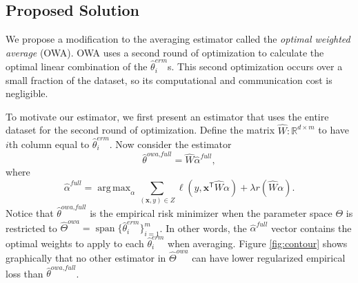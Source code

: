 \documentclass[twoside]{article}
\DeclareMathOperator*{\argmin}{arg\,min}
\DeclareMathOperator*{\argmax}{arg\,max}
\DeclareMathOperator*{\vecspan}{span}
\newcommand{\Q}{\mathcal{Q}}
\newcommand{\matW}{\hat W}
\newcommand{\W}{{\hat \Theta^{\textit{owa}}}}
\newcommand{\x}{\mathbf{x}}
\newcommand{\w}{\theta}
\newcommand{\ahat}{\hat\alpha}
\newcommand{\afull}{\ahat^{\textit{full}}}
\newcommand{\wowafull}{\hat\w^{\textit{owa,full}}}
\newcommand{\wmle}{\hat\w^{erm}}
\newcommand{\wstar}{{\w^{*}}}
\newcommand{\wq}{\hat\w^{q}}
\newcommand{\wqstar}{\hat\w^{q^*}}
\newcommand{\reg}{r}
\newcommand{\loss}{\ell}
\newcommand{\trans}[1]{\ensuremath{{#1}^{\mathsf{T}}}}
\newcommand{\ltwo}[1]{{\lVert {#1} \rVert}}
\begin{document}

\subsection{Proposed Solution}

We propose a modification to the averaging estimator called the \emph{optimal weighted average} (OWA). 
OWA uses a second round of optimization to calculate the optimal linear combination of the $\wmle_i$s.
This second optimization occurs over a small fraction of the dataset,
so its computational and communication cost is negligible.

To motivate our estimator,
we first present an estimator that uses the entire dataset for the second round of optimization.
Define the matrix $\matW : \mathbb{R}^{d\times m}$ to have $i$th column equal to $\wmle_i$.
Now consider the estimator
\begin{equation}
\wowafull = \matW \afull
,
\end{equation}
where
\begin{equation}
\label{eq:afull}
\afull = \argmax_\alpha \sum _{(\x,y)\in Z} \loss\left(y,\trans\x \matW \alpha \right)
+
\lambda \reg(\matW\alpha)
.
\end{equation}
Notice that $\wowafull$ is the empirical risk minimizer when the parameter space $\Theta$ is restricted to $\W = \vecspan \{\wmle_i\}_{i=1}^m$.
In other words, the $\afull$ vector contains the optimal weights to apply to each $\wmle_i$ when averaging.
Figure \ref{fig:contour} shows graphically that no other estimator in $\W$ can have lower regularized empirical loss than $\wowafull$.
\end{document}
